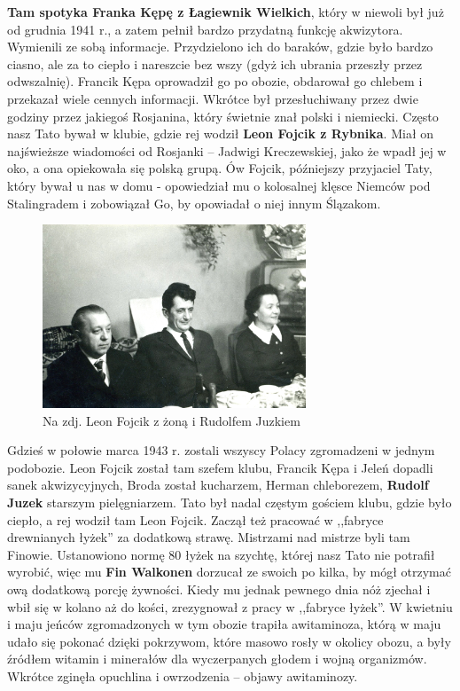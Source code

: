 \textbf{Tam spotyka Franka Kępę z Łagiewnik Wielkich}, który w niewoli był już od grudnia 1941 r., a zatem pełnił bardzo przydatną funkcję akwizytora. Wymienili ze sobą informacje. Przydzielono ich do baraków, gdzie było bardzo ciasno, ale za to ciepło i nareszcie bez wszy (gdyż ich ubrania przeszły przez odwszalnię). Francik Kępa oprowadził go po obozie, obdarował go chlebem i przekazał wiele cennych informacji. Wkrótce był przesłuchiwany przez dwie godziny przez jakiegoś Rosjanina, który świetnie znał polski i niemiecki. Często nasz Tato bywał w klubie, gdzie rej wodził \textbf{Leon Fojcik z Rybnika}. Miał on najświeższe wiadomości od Rosjanki – Jadwigi Kreczewskiej, jako że wpadł jej w oko, a ona opiekowała się polską grupą. Ów Fojcik, późniejszy przyjaciel Taty, który bywał u nas w domu - opowiedział mu o kolosalnej klęsce Niemców pod Stalingradem i zobowiązał Go, by opowiadał o niej innym Ślązakom. 

\begin{figure}[!h]
\begin{center}
\includegraphics[width=0.7\textwidth]{photo/leon_fojcik.jpg}
\caption[Leon Fojcik z żoną i Rudolfem Juzkiem]{Na zdj. Leon Fojcik z żoną i Rudolfem Juzkiem}
\end{center}
\end{figure}

Gdzieś w połowie marca 1943 r. zostali wszyscy Polacy zgromadzeni w jednym podobozie. Leon Fojcik został tam szefem klubu, Francik Kępa i Jeleń dopadli sanek akwizycyjnych, Broda został kucharzem, Herman chleborezem, \textbf{Rudolf Juzek} starszym pielęgniarzem. Tato był nadal częstym gościem klubu, gdzie było ciepło, a rej wodził tam Leon Fojcik. Zaczął też pracować w ,,fabryce drewnianych łyżek'' za dodatkową strawę. Mistrzami nad mistrze byli tam Finowie. Ustanowiono normę 80 łyżek na szychtę, której nasz Tato nie potrafił wyrobić, więc mu \textbf{Fin Walkonen} dorzucał ze swoich po kilka, by mógł otrzymać ową dodatkową porcję żywności. Kiedy mu jednak pewnego dnia nóż zjechał i wbił się w kolano aż do kości, zrezygnował z pracy w ,,fabryce łyżek''. W kwietniu i maju jeńców zgromadzonych w tym obozie trapiła awitaminoza, którą w maju udało się pokonać dzięki pokrzywom, które masowo rosły w okolicy obozu, a były źródłem witamin i minerałów dla wyczerpanych głodem i wojną organizmów. Wkrótce zginęła opuchlina i owrzodzenia -- objawy awitaminozy.

